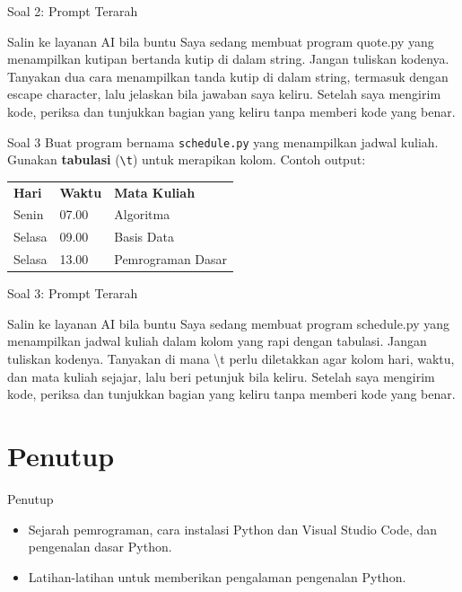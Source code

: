 \documentclass[aspectratio=169, table]{beamer}
\begin{document}
\begin{frame}{Soal 2: Prompt Terarah}
\begin{block}{Salin ke layanan AI bila buntu}
\small Saya sedang membuat program quote.py yang menampilkan kutipan bertanda kutip di dalam string. Jangan tuliskan kodenya. Tanyakan dua cara menampilkan tanda kutip di dalam string, termasuk dengan escape character, lalu jelaskan bila jawaban saya keliru. Setelah saya mengirim kode, periksa dan tunjukkan bagian yang keliru tanpa memberi kode yang benar.
\end{block}
\end{frame}

\begin{frame}{Soal 3}
	Buat program bernama \texttt{schedule.py} yang menampilkan jadwal kuliah. Gunakan \textbf{tabulasi} (\texttt{\textbackslash t}) untuk merapikan kolom. Contoh output:
	\\[15pt]
	\begin{tabular}{l l l}
		\textbf{Hari} & \textbf{Waktu} & \textbf{Mata Kuliah} \\
		Senin & 07.00 & Algoritma \\
		Selasa & 09.00 & Basis Data \\
		Selasa & 13.00 & Pemrograman Dasar \\
	\end{tabular}
\end{frame}

\begin{frame}{Soal 3: Prompt Terarah}
\begin{block}{Salin ke layanan AI bila buntu}
\small Saya sedang membuat program schedule.py yang menampilkan jadwal kuliah dalam kolom yang rapi dengan tabulasi. Jangan tuliskan kodenya. Tanyakan di mana \textbackslash t perlu diletakkan agar kolom hari, waktu, dan mata kuliah sejajar, lalu beri petunjuk bila keliru. Setelah saya mengirim kode, periksa dan tunjukkan bagian yang keliru tanpa memberi kode yang benar.
\end{block}
\end{frame}

\section{Penutup}
\begin{frame}[fragile]{Penutup}
\begin{itemize}
\item Sejarah pemrograman, cara instalasi Python dan Visual Studio Code, dan pengenalan dasar Python.
\item Latihan-latihan untuk memberikan pengalaman pengenalan Python.
\end{itemize}
\end{frame}
\end{document}
